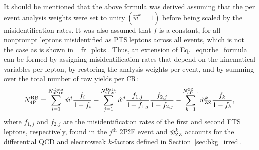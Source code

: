 It should be mentioned that the above formula was derived assuming that the per event analysis weights were set to unity $\left( \hat{w}^k = 1 \right)$ before being scaled by the misidentification rates.
It was also assumed that $f$ is a constant, for all nonprompt leptons misidentified as PTS leptons across all events, which is not the case as is shown in \figurename~\ref{fr_plots}.
Thus, an extension of Eq.~\ref{eqn:rbe_formula} can be formed by assigning misidentification rates that depend on the kinematical variables per lepton,
by restoring the analysis weights per event,
and by summing over the total number of raw yields per CR:
\begin{equation}
	\label{eqn:rbe_formula_final}
	N_\text{4P}^\text{RB} =
	  \sum_{i=1}^{N_{\text{3P1F}}^\text{Data}} \hat{w}^i \frac{f_i}{1 - f_i}
	- \sum_{j=1}^{N_{\text{2P2F}}^\text{Data}} \hat{w}^j \frac{f_{1,j}}{1 - f_{1,j}}\frac{f_{2,j}}{1 - f_{2,j}}
	- \sum_{k=1}^{N_{\text{3P1F}}^{\mathrm{Z}\mathrm{Z}}} \hat{w}^{k}_{\mathrm{Z}\mathrm{Z}} \frac{f_k}{1 - f_k},
\end{equation}
where $f_{1,j}$ and $f_{2,j}$ are the misidentification rates of the first and second FTS leptons, respectively, found in the $j^{\text{th}}$ 2P2F event
and $\hat{w}^k_{\mathrm{Z}\mathrm{Z}}$ accounts for the differential QCD and electroweak $k$-factors defined in Section~\ref{sec:bkg_irred}.

